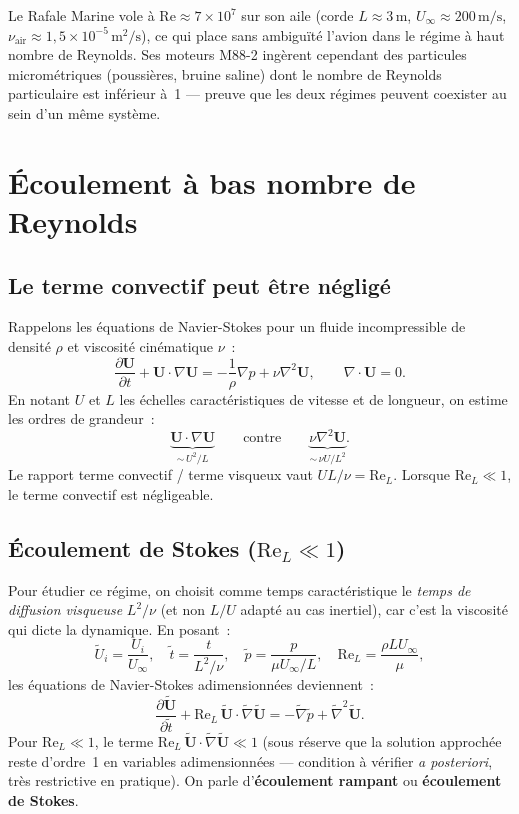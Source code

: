 \documentclass[11pt,a4paper]{report}
\newcommand{\pd}[2]{\dfrac{\partial #1}{\partial #2}}
\begin{document}
Le Rafale Marine vole \`a $\mathrm{Re} \approx 7\times10^7$ sur son aile (corde $L\approx
3\,\text{m}$, $U_\infty\approx 200\,\text{m/s}$, $\nu_\text{air}\approx
1{,}5\times10^{-5}\,\text{m}^2/\text{s}$), ce qui place sans ambigu\"{i}t\'e l'avion dans
le r\'egime \`a haut nombre de Reynolds. Ses moteurs M88-2 ing\`erent cependant des
particules microm\'etriques (poussi\`eres, bruine saline) dont le nombre de Reynolds
particulaire est inf\'erieur \`a~1 --- preuve que les deux r\'egimes peuvent coexister au
sein d'un m\^eme syst\`eme.

\section{\'Ecoulement \`a bas nombre de Reynolds}

\subsection{Le terme convectif peut \^etre n\'eglig\'e}

Rappelons les \'equations de Navier-Stokes pour un fluide incompressible de densit\'e
$\rho$ et viscosit\'e cin\'ematique $\nu$~:
\[
  \pd{\bm{U}}{t} + \bm{U}\cdot\nabla\bm{U}
  = -\frac{1}{\rho}\nabla p + \nu\nabla^2\bm{U},
  \qquad \nabla\cdot\bm{U}=0.
\]
En notant $U$ et $L$ les \'echelles caract\'eristiques de vitesse et de longueur, on
estime les ordres de grandeur~:
\[
  \underbrace{\bm{U}\cdot\nabla\bm{U}}_{\sim\, U^2/L}
  \qquad\text{contre}\qquad
  \underbrace{\nu\nabla^2\bm{U}}_{\sim\, \nu U/L^2}.
\]
Le rapport terme convectif / terme visqueux vaut $UL/\nu = \mathrm{Re}_L$. Lorsque
$\mathrm{Re}_L \ll 1$, le terme convectif est n\'egligeable.

\subsection{\'Ecoulement de Stokes ($\mathrm{Re}_L \ll 1$)}

Pour \'etudier ce r\'egime, on choisit comme temps caract\'eristique le \emph{temps de
diffusion visqueuse} $L^2/\nu$ (et non $L/U$ adapt\'e au cas inertiel), car c'est la
viscosit\'e qui dicte la dynamique. En posant~:
\[
  \tilde{U}_i = \frac{U_i}{U_\infty}, \quad
  \tilde{t} = \frac{t}{L^2/\nu}, \quad
  \tilde{p} = \frac{p}{\mu U_\infty/L},
  \quad \mathrm{Re}_L = \frac{\rho L U_\infty}{\mu},
\]
les \'equations de Navier-Stokes adimensionn\'ees deviennent~:
\[
  \pd{\tilde{\bm{U}}}{\tilde{t}} + \mathrm{Re}_L\,\tilde{\bm{U}}\cdot
  \tilde{\nabla}\tilde{\bm{U}}
  = -\tilde{\nabla}\tilde{p} + \tilde{\nabla}^2\tilde{\bm{U}}.
\]
Pour $\mathrm{Re}_L \ll 1$, le terme $\mathrm{Re}_L\,\tilde{\bm{U}}\cdot
\tilde{\nabla}\tilde{\bm{U}} \ll 1$ (sous r\'eserve que la solution approch\'ee reste
d'ordre~1 en variables adimensionn\'ees --- condition \`a v\'erifier \emph{a posteriori},
tr\`es restrictive en pratique). On parle d'\textbf{\'ecoulement rampant} ou
\textbf{\'ecoulement de Stokes}.
\end{document}

